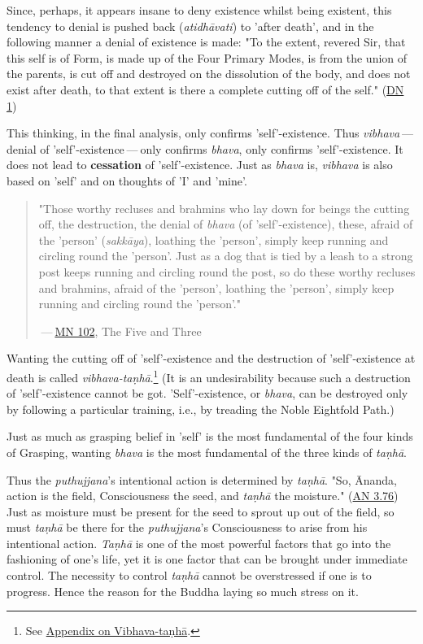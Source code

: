 Since, perhaps, it appears insane to deny existence whilst being existent, this tendency to denial is pushed back (\emph{atidhāvati}) to 'after death', and in the following manner a denial of existence is made: "To the extent, revered Sir, that this self is of Form, is made up of the Four Primary Modes, is from the union of the parents, is cut off and destroyed on the dissolution of the body, and does not exist after death, to that extent is there a complete cutting off of the self." (\href{https://suttacentral.net/dn1/en/bodhi}{DN 1})

This thinking, in the final analysis, only confirms 'self'-existence. Thus \emph{vibhava} --- denial of 'self'-existence --- only confirms \emph{bhava}, only confirms 'self'-existence. It does not lead to \textbf{cessation} of 'self'-existence. Just as \emph{bhava} is, \emph{vibhava} is also based on 'self' and on thoughts of 'I' and 'mine'.

\begin{quote}
"Those worthy recluses and brahmins who lay down for beings the cutting off, the destruction, the denial of \emph{bhava} (of 'self'-existence), these, afraid of the 'person' (\emph{sakkāya}), loathing the 'person', simply keep running and circling round the 'person'. Just as a dog that is tied by a leash to a strong post keeps running and circling round the post, so do these worthy recluses and brahmins, afraid of the 'person', loathing the 'person', simply keep running and circling round the 'person'."

 --- \href{https://suttacentral.net/mn102/en/sujato}{MN 102}, The Five and Three
\end{quote}

Wanting the cutting off of 'self'-existence and the destruction of 'self'-existence at death is called \emph{vibhava-taṇhā}.\footnote{See \href{ch-99-appendix.xml\#vibhava-tanha}{Appendix on Vibhava-taṇhā}.} (It is an undesirability because such a destruction of 'self'-existence cannot be got. 'Self'-existence, or \emph{bhava}, can be destroyed only by following a particular training, i.e., by treading the Noble Eightfold Path.)

Just as much as grasping belief in 'self' is the most fundamental of the four kinds of Grasping, wanting \emph{bhava} is the most fundamental of the three kinds of \emph{taṇhā}.

Thus the \emph{puthujjana}'s intentional action is determined by \emph{taṇhā}. "So, Ānanda, action is the field, Consciousness the seed, and \emph{taṇhā} the moisture." (\href{https://suttacentral.net/an3.76/en/thanissaro}{AN 3.76}) Just as moisture must be present for the seed to sprout up out of the field, so must \emph{taṇhā} be there for the \emph{puthujjana}'s Consciousness to arise from his intentional action. \emph{Taṇhā} is one of the most powerful factors that go into the fashioning of one's life, yet it is one factor that can be brought under immediate control. The necessity to control \emph{taṇhā} cannot be overstressed if one is to progress. Hence the reason for the Buddha laying so much stress on it.

